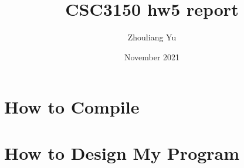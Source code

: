 \documentclass{article}
\title{CSC3150 hw5 report}
\author{Zhouliang Yu}
\date{November 2021}
\begin{document}
\maketitle

\section{How to Compile}

\section{How to Design My Program}
\subsection{}
\end{document}
